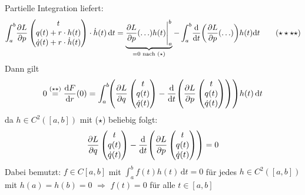 Partielle Integration liefert:
\begin{align*}
	\int_{a} ^{b} \! \diff{L}{p} \begin{pmatrix}
		t \\ q(t) + r \cdot h(t) \\ \dot q(t) + r \cdot \dot h(t)
	\end{pmatrix} \cdot  \dot h (t)  \, \mathrm{d}t = \underbrace{\diff{L}{p} (\ldots ) h(t)\Bigg|_a^b}_{=0 \text{ nach }(\star)} - \int_{a} ^{b} \! \frac{\mathrm{d}}{\mathrm{d}t} 
	\enbrace*{\diff{L}{p} (\ldots ) }  h(t)   \mathrm{d}t \tag{$\star\star\star\star$}
\end{align*}
Dann gilt
\[
	0 \stackrel{(\star\star)}{=} \frac{\mathrm{d} F}{\mathrm{d}r} (0) = \int_{a} ^{b} \! \enbrace*{\diff{L}{q} \begin{pmatrix}
		t \\ q(t) \\ \dot q(t)
	\end{pmatrix}  - \frac{\mathrm{d}}{\mathrm{d}t} \enbrace*{ \diff{L}{p} \begin{pmatrix}
		t \\ q(t) \\ \dot q(t)
	\end{pmatrix} } }  h(t) \, \mathrm{d}t
\]
da $h\in C^2([a,b])$ mit ($\star$) beliebig folgt: 
\[
	\diff{L}{q} \begin{pmatrix}
		t \\ q(t) \\ \dot q(t)
	\end{pmatrix} - \frac{\mathrm{d}}{\mathrm{d} t} \enbrace*{ \diff{L}{p} \begin{pmatrix}
		t \\ q(t) \\ \dot q(t)
	\end{pmatrix}} =0 
\]  
Dabei bemutzt: $f \in C[a,b]$ mit $\int_{a} ^{b} \! f(t) h(t)  \, \mathrm{d}t =0$ für jedes $h \in C^2([a,b])$ mit $h(a)=h(b)=0$ $\Rightarrow $ $f(t)=0$ für alle 
$t \in[a,b]$ \bewende

